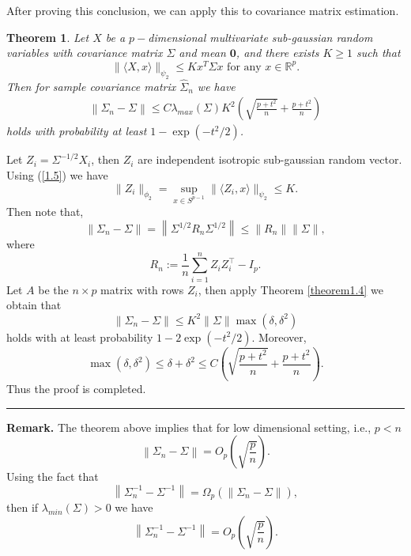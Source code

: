 \documentclass[12pt]{article}
\numberwithin{equation}{section}
\newtheorem{theorem}{Theorem}[section]
\newenvironment{proof}{{\bf Proof:}}{\hfill\rule{2mm}{2mm}}
\begin{document}
After proving this conclusion, we can apply this to covariance matrix estimation.
\begin{theorem}\label{theorem1.5}
	Let $X$ be a $p-$dimensional multivariate sub-gaussian random variables with covariance matrix $\Sigma$ and mean $\boldsymbol{0}$, and there exists $K\geq 1$ such that
	\begin{equation}\label{1.5}
	\|\langle X, x\rangle\|_{\psi_{2}} \leq Kx^T\Sigma x \text { for any } x \in \mathbb{R}^{p}.
	\end{equation}
	Then for sample covariance matrix $\widehat{\Sigma}_n$ we have
	\begin{align}
	\left\|\Sigma_{n}-\Sigma\right\| \leq C\lambda_{max}(\Sigma) K^{2}\left(\sqrt{\frac{p+t^2}{n}}+\frac{p+t^2}{n}\right)
	\end{align}
	holds with probability at least $1-\exp(-t^2/2)$.
\end{theorem}
\begin{proof}
	Let $Z_i=\Sigma^{-1/2}X_i$, then $Z_i$ are independent isotropic sub-gaussian random vector. Using (\ref{1.5}) we have
	\begin{equation}
	\|Z_i\|_{\phi_2}=\sup_{x\in S^{p-1}}\|\langle Z_i, x\rangle\|_{\psi_{2}}\leq K.
	\end{equation}
	Then note that,
	$$
	\left\|\Sigma_{n}-\Sigma\right\|=\left\|\Sigma^{1 / 2} R_{n} \Sigma^{1 / 2}\right\| \leq\left\|R_{n}\right\|\|\Sigma\|,
	$$
	where
	$$
	R_{n}:=\frac{1}{n} \sum_{i=1}^{n} Z_{i} Z_{i}^{\top}-I_{p}.
	$$
	Let $A$ be the $n\times p$ matrix with rows $Z_i$, then apply Theorem \ref{theorem1.4} we obtain that
	$$
	\left\|\Sigma_{n}-\Sigma\right\| \leq K^{2}\|\Sigma\| \max \left(\delta, \delta^{2}\right)
	$$
	holds with at least probability $1-2\exp(-t^2/2)$. Moreover,
	$$
	\max \left(\delta, \delta^{2}\right)\leq \delta+\delta^2\leq C\left(\sqrt{\frac{p+t^2}{n}}+\frac{p+t^2}{n}\right).
	$$
	Thus the proof is completed.
\end{proof}\newline
\textbf{Remark.} The theorem above implies that for low dimensional setting, i.e., $p<n$
\begin{equation}
\left\|\Sigma_{n}-\Sigma\right\|=O_p\left(\sqrt{\frac{p}{n}}\right).
\end{equation}
Using the fact that
$$
\left\|\Sigma_{n}^{-1}-\Sigma^{-1}\right\|=\Omega_p\left(\left\|\Sigma_{n}-\Sigma\right\|\right),
$$
then if $\lambda_{min}(\Sigma)>0$ we have
\begin{equation}
\left\|\Sigma_{n}^{-1}-\Sigma^{-1}\right\|=O_p\left(\sqrt{\frac{p}{n}}\right).
\end{equation}
\end{document}

